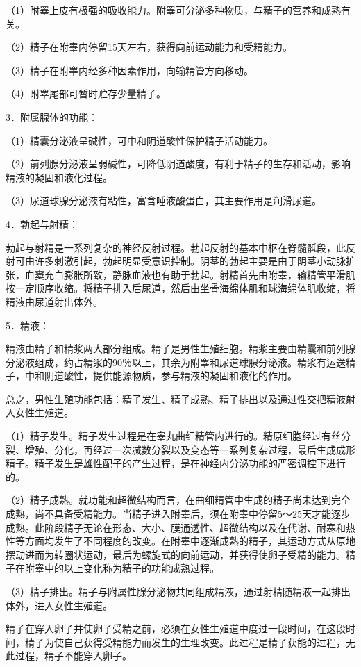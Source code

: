 \documentclass[12pt,UTF8,openany]{ctexbook}
\begin{document}
（1）附睾上皮有极强的吸收能力。附睾可分泌多种物质，与精子的营养和成熟有关。

（2）精子在附睾内停留15天左右，获得向前运动能力和受精能力。

（3）精子在附睾内经多种因素作用，向输精管方向移动。

（4）附睾尾部可暂时贮存少量精子。

3．附属腺体的功能：

（1）精囊分泌液呈碱性，可中和阴道酸性保护精子活动能力。

（2）前列腺分泌液呈弱碱性，可降低阴道酸度，有利于精子的生存和活动，影响精液的凝固和液化过程。

（3）尿道球腺分泌液有粘性，富含唾液酸蛋白，其主要作用是润滑尿道。

4．勃起与射精：

勃起与射精是一系列复杂的神经反射过程。勃起反射的基本中枢在脊髓骶段，此反射可由许多刺激引起，勃起明显受意识控制。阴茎的勃起主要是由于阴茎小动脉扩张，血窦充血膨胀所致，静脉血液也有助于勃起。射精首先由附睾，输精管平滑肌按一定顺序收缩。将精子排入后尿道，然后由坐骨海绵体肌和球海绵体肌收缩，将精液由尿道射出体外。

5．精液：

精液由精子和精浆两大部分组成。精子是男性生殖细胞。精浆主要由精囊和前列腺分泌液组成，约占精浆的90％以上，其余为附睾和尿道球腺分泌液。精浆有运送精子，中和阴道酸性，提供能源物质，参与精液的凝固和液化的作用。

总之，男性生殖功能包括：精子发生、精子成熟、精子排出以及通过性交把精液射入女性生殖道。

（1）精子发生。精子发生过程是在睾丸曲细精管内进行的。精原细胞经过有丝分裂、增殖、分化，再经过一次减数分裂以及变态等一系列复杂过程，最后生成成形精子。精子发生是雄性配子的产生过程，是在神经内分泌功能的严密调控下进行的。

（2）精子成熟。就功能和超微结构而言，在曲细精管中生成的精子尚未达到完全成熟，尚不具备受精能力。当精子进入附睾后，须在附睾中停留5～25天才能逐步成熟。此阶段精子无论在形态、大小、膜通透性、超微结构以及在代谢、耐寒和热性等方面均发生了不同程度的改变。在附睾中逐渐成熟的精子，其运动方式从原地摆动进而为转圈状运动，最后为螺旋式的向前运动，并获得使卵子受精的能力。精子在附睾中的以上变化称为精子的功能成熟过程。

（3）精子排出。精子与附属性腺分泌物共同组成精液，通过射精随精液一起排出体外，进入女性生殖道。

精子在穿入卵子并使卵子受精之前，必须在女性生殖道中度过一段时间，在这段时间，精子为使自己获得受精能力而发生的生理改变。此过程是精子获能的过程，无此过程，精子不能穿入卵子。
\end{document}
